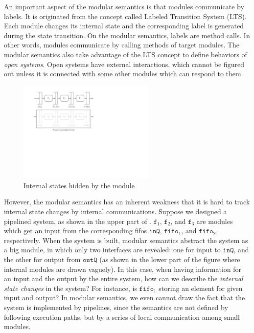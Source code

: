 An important aspect of the modular semantics is that modules
communicate by labels. It is originated from the concept called
Labeled Transition System (LTS). Each module changes its internal
state and the corresponding label is generated during the state
transition. On the modular semantics, labels are method calls. In
other words, modules communicate by calling methods of target modules.
The modular semantics also take advantage of the LTS concept to define
behaviors of \emph{open systems}. Open systems have external
interactions, which cannot be figured out unless it is connected with
some other modules which can respond to them.

\begin{figure}[t]
  \centering
  \includegraphics[width=0.6\textwidth]{figures/pipeline-internal.pdf}
  \caption{Internal states hidden by the module}
  \label{ex-modular-semantics-disadvantage}
\end{figure}

However, the modular semantics has an inherent weakness that it is
hard to track internal state changes by internal communications.
Suppose we designed a pipelined system, as shown in the upper part of
. $\texttt{f}_1$,
$\texttt{f}_2$, and $\texttt{f}_3$ are modules which get an input from
the corresponding fifos $\texttt{inQ}$, $\texttt{fifo}_1$, and
$\texttt{fifo}_2$, respectively. When the system is built, modular
semantics abstract the system as a big module, in which only two
interfaces are revealed: one for input to $\texttt{inQ}$, and the
other for output from $\texttt{outQ}$ (as shown in the lower part of
the figure where internal modules are drawn vaguely). In this case,
when having information for an input and the output by the entire
system, how can we describe the \emph{internal state changes} in the
system? For instance, is $\texttt{fifo}_1$ storing an element for
given input and output? In modular semantics, we even cannot draw the
fact that the system is implemented by pipelines, since the semantics
are not defined by following execution paths, but by a series of local
communication among small modules.

